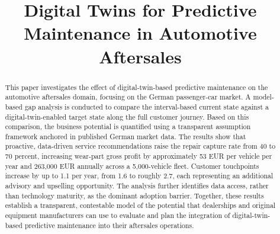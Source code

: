 \documentclass[conference,a4paper]{IEEEtran}
\begin{document}
\title{Digital Twins for Predictive Maintenance in Automotive Aftersales}

\author{
  \and
  \and
}

\maketitle

\begin{abstract}
This paper investigates the effect of digital-twin-based predictive maintenance on the automotive aftersales domain, focusing on the German passenger-car market. A model-based gap analysis is conducted to compare the interval-based current state against a digital-twin-enabled target state along the full customer journey. Based on this comparison, the business potential is quantified using a transparent assumption framework anchored in published German market data. The results show that proactive, data-driven service recommendations raise the repair capture rate from 40 to 70 percent, increasing wear-part gross profit by approximately 53 EUR per vehicle per year and 263,000 EUR annually across a 5,000-vehicle fleet. Customer touchpoints increase by up to 1.1 per year, from 1.6 to roughly 2.7, each representing an additional advisory and upselling opportunity. The analysis further identifies data access, rather than technology maturity, as the dominant adoption barrier. Together, these results establish a transparent, contestable model of the potential that dealerships and original equipment manufacturers can use to evaluate and plan the integration of digital-twin-based predictive maintenance into their aftersales operations.
\end{abstract}
\end{document}
